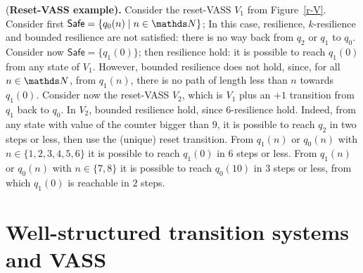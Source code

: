 \documentclass[runningheads]{llncs}
\newcommand{\alain}[1]{\todo[inline,color=red!20]{{\bf AF:} #1}}
\newcommand{\Safe}{\textsf{Safe}}
\begin{document}
\begin{example}\label{Example}
{(\bf Reset-VASS example).}
Consider the 
 reset-VASS $V_1$ from Figure~\ref{r-V}.
Consider first $\Safe = \{q_0(n) \mid n \in \N\}$; In this case,  {resilience}, 
{$k$-resilience} and {bounded resilience} are not satisfied: there is no  way back from $q_2$ or $q_1$ to $q_0$. Consider now $\Safe = \{q_1(0)\} $; then {resilience} hold: it is possible to reach $q_1(0)$ from any state of $V_1$. However, {bounded resilience} does not hold, since, for all $n\in \N$, from $q_1(n)$, there is no path of length less than $n$ towards $q_1(0)$. Consider now the 
 reset-VASS $V_2$, which is $V_1$ plus an $+1$ transition from $q_1$ back to $q_0$. In $V_2$, {bounded resilience} hold, since $6$-resilience hold. 
Indeed, from any state with value of the counter bigger than $9$, it is possible to reach $q_2$ in two steps or less, then use the (unique) reset transition. From $q_1(n)$ or $q_0(n)$ with $n \in \{1, 2, 3, 4, 5, 6\}$ it is possible to reach $q_1(0)$ in $6$ steps or less. From 
$q_1(n)$ or $q_0(n)$ with $n \in \{7,8\}$ it is possible to reach $q_0(10)$ in $3$ steps or less, from which $q_1(0)$ is reachable in $2$ steps. 
\end{example}





\section{Well-structured transition systems and VASS}\label{section definitions}
\end{document}
